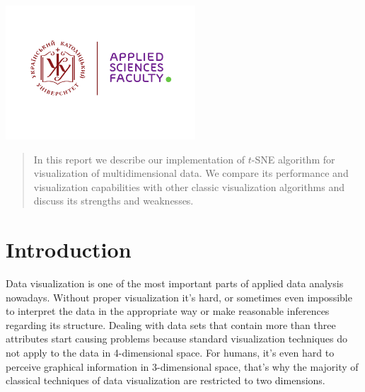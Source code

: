 \begin{titlepage}

\includegraphics[height=5cm]{UCU-Apps.png}\\[1cm] %
 

\vfill %

\end{titlepage}


\begin{abstract}
In this report we describe our implementation of $t$-SNE algorithm for visualization of multidimensional data. We compare its performance and visualization capabilities with other classic visualization algorithms and discuss its strengths and weaknesses.
	
\end{abstract}

\section{Introduction}

Data visualization is one of the most important parts of applied data analysis nowadays. Without proper visualization it’s hard, or sometimes even impossible to interpret the data in the appropriate way or make reasonable inferences regarding its structure. Dealing with data sets that contain more than three attributes start causing problems because standard visualization techniques do not apply to the data in 4-dimensional space. For humans, it’s even hard to perceive graphical information in 3-dimensional space, that’s why the majority of classical techniques of data visualization are restricted to two dimensions. \\


